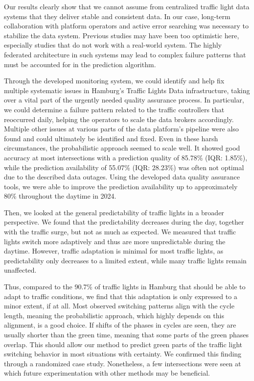 \begin{Summary}
Our results clearly show that we cannot assume from centralized traffic light data systems that they deliver stable and consistent data. In our case, long-term collaboration with platform operators and active error searching was necessary to stabilize the data system. Previous studies may have been too optimistic here, especially studies that do not work with a real-world system. The highly federated architecture in such systems may lead to complex failure patterns that must be accounted for in the prediction algorithm. 

Through the developed monitoring system, we could identify and help fix multiple systematic issues in Hamburg’s Traffic Lights Data infrastructure, taking over a vital part of the urgently needed quality assurance process. In particular, we could determine a failure pattern related to the traffic controllers that reoccurred daily, helping the operators to scale the data brokers accordingly. Multiple other issues at various parts of the data platform's pipeline were also found and could ultimately be identified and fixed. Even in these harsh circumstances, the probabilistic approach seemed to scale well. It showed good accuracy at most intersections with a prediction quality of 85.78\% (IQR: 1.85\%), while the prediction availability of 55.07\% (IQR: 28.23\%) was often not optimal due to the described data outages. Using the developed data quality assurance tools, we were able to improve the prediction availability up to approximately 80\% throughout the daytime in 2024.

Then, we looked at the general predictability of traffic lights in a broader perspective. We found that the predictability decreases during the day, together with the traffic surge, but not as much as expected. We measured that traffic lights switch more adaptively and thus are more unpredictable during the daytime. However, traffic adaptation is minimal for most traffic lights, as predictability only decreases to a limited extent, while many traffic lights remain unaffected.

Thus, compared to the 90.7\% of traffic lights in Hamburg that should be able to adapt to traffic conditions, we find that this adaptation is only expressed to a minor extent, if at all. Most observed switching patterns align with the cycle length, meaning the probabilistic approach, which highly depends on this alignment, is a good choice. If shifts of the phases in cycles are seen, they are usually shorter than the green time, meaning that some parts of the green phases overlap. This should allow our method to predict green parts of the traffic light switching behavior in most situations with certainty. We confirmed this finding through a randomized case study. Nonetheless, a few intersections were seen at which future experimentation with other methods may be beneficial.
\end{Summary}

